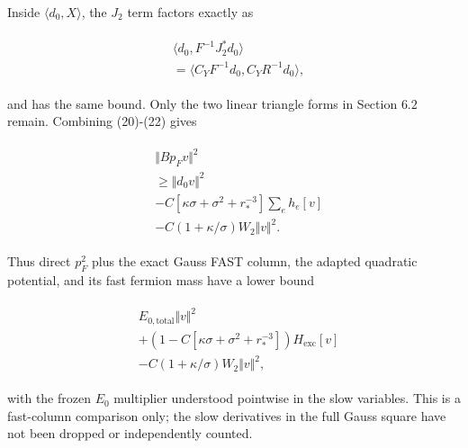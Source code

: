Inside \(\langle d_{0},X\rangle\), the \(J_{2}\) term factors exactly as

\begin{gather*}
\begin{aligned}
& \langle d_{0},F^{-1} J_{2}^{*} d_{0}\rangle \\
& =\langle C_{Y} F^{-1} d_{0},C_{Y} R^{-1} d_{0}\rangle ,
\end{aligned}\tag{22}
\end{gather*}

and has the same bound. Only the two linear triangle forms in Section
\(6.2\) remain. Combining (20)-(22) gives

\begin{gather*}
\begin{aligned}
& \Vert B p_{F} v\Vert ^{2} \\
& \ge \Vert d_{0} v\Vert ^{2} \\
& -C[\kappa  \sigma +\sigma ^{2}+r_{*}^{-3}] \sum _{e} h_{e}[v] \\
& -C(1+\kappa /\sigma ) W_{2}\Vert v\Vert ^{2}.
\end{aligned}\tag{23}
\end{gather*}

Thus direct \(p_{F}^{2}\) plus the exact Gauss FAST column, the adapted
quadratic potential, and its fast fermion mass have a lower bound

\begin{gather*}
\begin{aligned}
& E_{0,\mathrm{total}} \Vert v\Vert ^{2} \\
& +(1-C[\kappa  \sigma +\sigma ^{2}+r_{*}^{-3}]) H_{\mathrm{exc}}[v] \\
& -C(1+\kappa /\sigma ) W_{2}\Vert v\Vert ^{2},
\end{aligned}\tag{24}
\end{gather*}

with the frozen \(E_{0}\) multiplier understood pointwise in the slow
variables. This is a fast-column comparison only; the slow derivatives
in the full Gauss square have not been dropped or independently counted.

